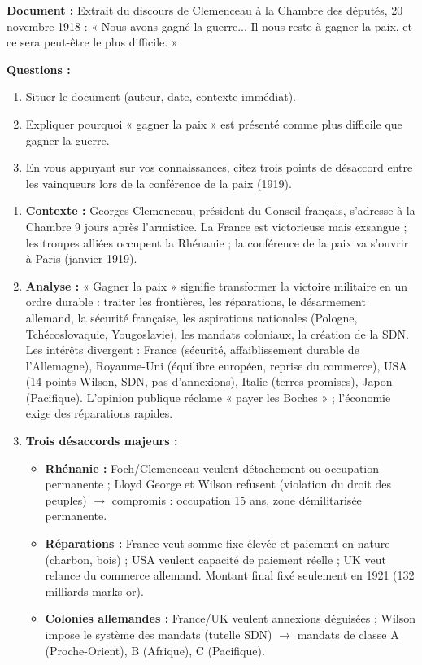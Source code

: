\documentclass[11pt]{article}
\begin{document}
\begin{exercice}
\textbf{Document :} Extrait du discours de Clemenceau à la Chambre des députés, 20 novembre 1918 : « Nous avons gagné la guerre... Il nous reste à gagner la paix, et ce sera peut-être le plus difficile. »

\textbf{Questions :}
\begin{enumerate}
\item Situer le document (auteur, date, contexte immédiat).
\item Expliquer pourquoi « gagner la paix » est présenté comme plus difficile que gagner la guerre.
\item En vous appuyant sur vos connaissances, citez trois points de désaccord entre les vainqueurs lors de la conférence de la paix (1919).
\end{enumerate}
\end{exercice}

\begin{corrige}[Exercice n°1]
\begin{enumerate}
\item \textbf{Contexte :} Georges Clemenceau, président du Conseil français, s'adresse à la Chambre 9 jours après l'armistice. La France est victorieuse mais exsangue ; les troupes alliées occupent la Rhénanie ; la conférence de la paix va s'ouvrir à Paris (janvier 1919).
\item \textbf{Analyse :} « Gagner la paix » signifie transformer la victoire militaire en un ordre durable : traiter les frontières, les réparations, le désarmement allemand, la sécurité française, les aspirations nationales (Pologne, Tchécoslovaquie, Yougoslavie), les mandats coloniaux, la création de la SDN. Les intérêts divergent : France (sécurité, affaiblissement durable de l'Allemagne), Royaume-Uni (équilibre européen, reprise du commerce), USA (14 points Wilson, SDN, pas d'annexions), Italie (terres promises), Japon (Pacifique). L'opinion publique réclame « payer les Boches » ; l'économie exige des réparations rapides.
\item \textbf{Trois désaccords majeurs :}
  \begin{itemize}
  \item \textbf{Rhénanie :} Foch/Clemenceau veulent détachement ou occupation permanente ; Lloyd George et Wilson refusent (violation du droit des peuples) $\to$ compromis : occupation 15 ans, zone démilitarisée permanente.
  \item \textbf{Réparations :} France veut somme fixe élevée et paiement en nature (charbon, bois) ; USA veulent capacité de paiement réelle ; UK veut relance du commerce allemand. Montant final fixé seulement en 1921 (132 milliards marks-or).
  \item \textbf{Colonies allemandes :} France/UK veulent annexions déguisées ; Wilson impose le système des mandats (tutelle SDN) $\to$ mandats de classe A (Proche-Orient), B (Afrique), C (Pacifique).
  \end{itemize}
\end{enumerate}
\end{corrige}
\end{document}
